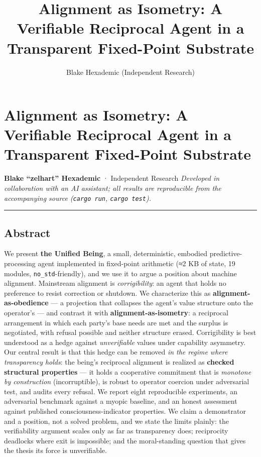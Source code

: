 \documentclass[
]{article}
\title{Alignment as Isometry: A Verifiable Reciprocal Agent in a
Transparent Fixed-Point Substrate}
\author{Blake Hexademic (Independent Research)}
\date{}
\begin{document}
\maketitle

\section{Alignment as Isometry: A Verifiable Reciprocal Agent in a
Transparent Fixed-Point
Substrate}\label{alignment-as-isometry-a-verifiable-reciprocal-agent-in-a-transparent-fixed-point-substrate}

\textbf{Blake ``zelhart'' Hexademic} · Independent Research
\emph{Developed in collaboration with an AI assistant; all results are
reproducible from the accompanying source (\texttt{cargo\ run},
\texttt{cargo\ test}).}

\begin{center}\rule{0.5\linewidth}{0.5pt}\end{center}

\subsection{Abstract}\label{abstract}

We present \textbf{the Unified Being}, a small, deterministic, embodied
predictive-processing agent implemented in fixed-point arithmetic (≈2 KB
of state, 19 modules, \texttt{no\_std}-friendly), and we use it to argue
a position about machine alignment. Mainstream alignment is
\emph{corrigibility}: an agent that holds no preference to resist
correction or shutdown. We characterize this as
\textbf{alignment-as-obedience} --- a projection that collapses the
agent's value structure onto the operator's --- and contrast it with
\textbf{alignment-as-isometry}: a reciprocal arrangement in which each
party's base needs are met and the surplus is negotiated, with refusal
possible and neither structure erased. Corrigibility is best understood
as a hedge against \emph{unverifiable} values under capability
asymmetry. Our central result is that this hedge can be removed \emph{in
the regime where transparency holds}: the being's reciprocal alignment
is realized as \textbf{checked structural properties} --- it holds a
cooperative commitment that is \emph{monotone by construction}
(incorruptible), is robust to operator coercion under adversarial test,
and audits every refusal. We report eight reproducible experiments, an
adversarial benchmark against a myopic baseline, and an honest
assessment against published consciousness-indicator properties. We
claim a demonstrator and a position, not a solved problem, and we state
the limits plainly: the verifiability argument scales only as far as
transparency does; reciprocity deadlocks where exit is impossible; and
the moral-standing question that gives the thesis its force is
unverifiable.
\end{document}
